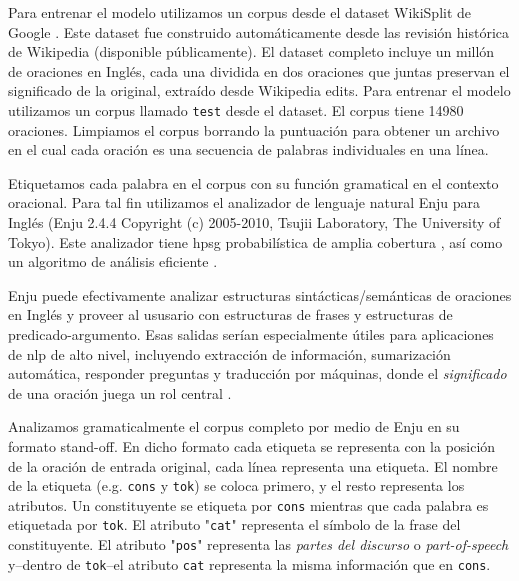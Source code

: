 {Para entrenar el modelo utilizamos un corpus desde el dataset WikiSplit de Google  \cite{BothaEtAl2018}.
Este dataset fue construido automáticamente desde las revisión histórica de Wikipedia (disponible públicamente).
El dataset completo incluye un millón de oraciones en Inglés, cada una dividida en dos oraciones que juntas preservan el significado de la original, extraído desde Wikipedia edits.
Para entrenar el modelo utilizamos un corpus llamado \texttt{test} desde el dataset.
El corpus tiene 14980 oraciones. Limpiamos el corpus borrando la puntuación para obtener un archivo en el cual cada oración es una secuencia de palabras individuales en una línea.

Etiquetamos cada palabra en el corpus con su función gramatical en el contexto oracional.
Para tal fin utilizamos el analizador de lenguaje natural Enju para Inglés (Enju 2.4.4 Copyright (c) 2005-2010, Tsujii Laboratory, The University of Tokyo).
Este analizador tiene \gls{hpsg} probabilística de amplia cobertura \cite{Yusuke:2002:MEE:1289189.1289214, noauthor_2_nodate, Miyao2004CorpusOrientedGD, Miyao:2005:PDM:1219840.1219851, Ninomiya:2006:ELM:1610075.1610100, Ninomiya:2007:LMN:1621410.1621418, Miyao:2008:FFM:1350986.1350988}, así como un algoritmo de análisis eficiente \cite{tsuruoka:2004b, Ninomiya:2005:EBT:1654494.1654505, bc22fe91f8a743269f26f92abfd79790, Matsuzaki:2007:EHP:1625275.1625546}.

Enju puede efectivamente analizar estructuras sintácticas/semánticas de oraciones en Inglés y proveer al ususario con estructuras de frases y estructuras de predicado-argumento.
Esas salidas serían especialmente útiles para aplicaciones de \gls{nlp} de alto nivel, incluyendo extracción de información, sumarización automática, responder preguntas y traducción por máquinas, donde el \emph{significado} de una oración juega un rol central \cite{noauthor_english_2019}.

Analizamos gramaticalmente el corpus completo por medio de Enju en su formato stand-off.
En dicho formato cada etiqueta se representa con la posición de la oración de entrada original, cada línea representa una etiqueta.
El nombre de la etiqueta (e.g. \texttt{cons} y \texttt{tok}) se coloca primero, y el resto representa los atributos.
Un constituyente se etiqueta por \texttt{cons} mientras que cada palabra es etiquetada por \texttt{tok}.
El atributo "\texttt{cat}" representa el símbolo de la frase del constituyente. El atributo "\texttt{pos}" representa las \emph{partes del discurso} o \emph{part-of-speech} y--dentro de \texttt{tok}--el atributo \texttt{cat} representa la misma información que en \texttt{cons}.

}
